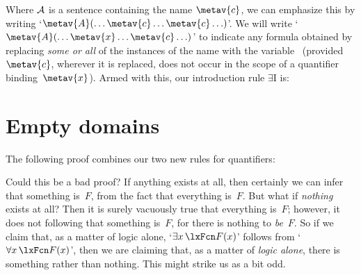 Where $\mathcal{A}$ is a sentence containing the name $\metav{c}$, we
can emphasize this by writing `$\metav{A}(\ldots \metav{c} \ldots
\metav{c}\ldots)$'. We will write `$\metav{A}(\ldots \metav{x} \ldots
\metav{c}\ldots)$' to indicate any formula obtained by replacing
\emph{some or all} of the instances of the name  with the
variable~ (provided~$\metav{c}$, wherever it is
replaced, does not occur in the scope of a quantifier
binding~$\metav{x}$). Armed with this, our introduction rule
$\exists$I is:

\section{Empty domains}
The following proof combines our two new rules for quantifiers:
	\begin{fitchproof}
		\PR
	\end{fitchproof}
Could this be a bad proof? If anything exists at all, then certainly we can infer that something is~$F$, from the fact that everything is~$F$. But what if \emph{nothing} exists at all? Then it is surely vacuously true that everything is~$F$; however, it does not following that something is~$F$, for there is nothing to \emph{be}~$F$. So if we claim that, as a matter of logic alone, `$\exists x\,\atom{F}{x}$' follows from `$\forall x\,\atom{F}{x}$', then we are claiming that, as a matter of \emph{logic alone}, there is something rather than nothing. This might strike us as a bit odd.

